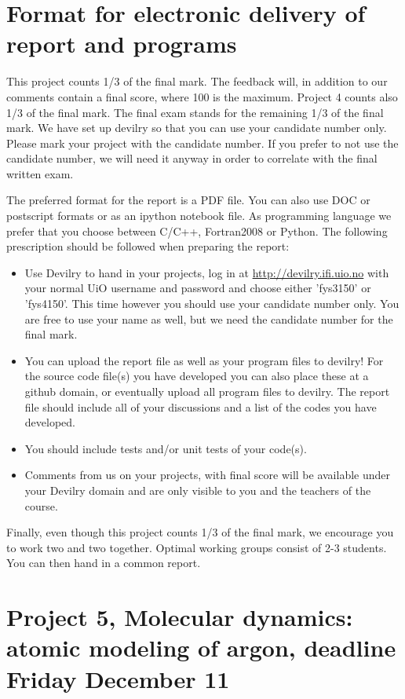 \documentclass[11pt,a4wide]{article}
\begin{document}
\section*{Format for electronic delivery of report and programs}
%
This project counts 1/3 of the final mark. The feedback will, in addition to our comments contain a final score, where 100 is the maximum. Project 4 counts also 1/3 of the final mark. The final exam stands for the remaining 1/3 of the final mark.
We have set up devilry so that you can use your candidate number only. Please mark your project with the candidate number. If you prefer to not use the candidate number, we will need it anyway in order to correlate with the final written exam. 

The preferred format for the report is a PDF file. You can also
use DOC or postscript formats or as an ipython notebook file. 
As programming language we prefer that you choose between C/C++, Fortran2008 or Python.
The following prescription should be followed when preparing the report:
\begin{itemize}
\item Use Devilry to hand in your projects, log in  at 
\url{ http://devilry.ifi.uio.no} with your normal UiO username and password
and choose either 'fys3150' or 'fys4150'. This time however you should use your candidate number only. You are free to use your name as well, but we need the candidate number for the final mark. 
\item You can upload the report file as well as your program files to devilry!  For the source code file(s) you have developed you can also place these at  a github domain, or eventually upload all program files to devilry.  
The report file should include all of your discussions and a list of the codes you have developed. 
\item You should include tests and/or unit tests of your code(s).
\item Comments  from us on your projects, with final score
will be available under
your Devilry domain and are only visible to you and the teachers of the course.

\end{itemize}

Finally, even though this project counts 1/3 of the final mark, 
we encourage you to work two and two together. Optimal working groups consist of 
2-3 students. You can then hand in a common report. 


\section*{Project 5, Molecular dynamics: atomic modeling of argon, deadline  Friday December 11}
\end{document}
